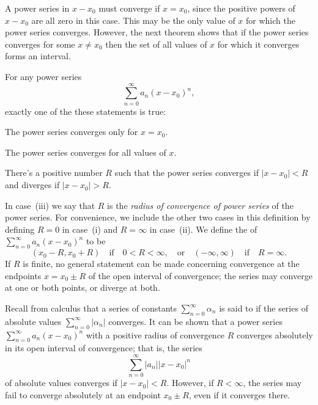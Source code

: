 A power series in $x-x_0$ must converge if $x=x_0$, since the positive
powers of $x-x_0$ are all zero in this case. This may be the only
value of $x$ for which the power series converges. However, the
next theorem shows that if the power series converges for some
$x\ne
x_0$ then the set of all values of $x$ for which it converges forms an
interval.

\begin{theorem}\label{thmtype:7.1.2}
For any power series
\[
\sum_{n=0}^\infty a_n(x-x_0)^n,
\]
exactly one of the these statements is true:
\begin{rmlist}
\item %
The power series converges  only for $x=x_0$.
\item %
The power series converges for all values of $x$.
\item %
There's a positive number $R$ such that  the power series
converges if $|x-x_0|<R$ and diverges if  $|x-x_0|>R$.
\end{rmlist}
\end{theorem}


In case~(iii) we say that $R$ is the
\emph{\color{blue}radius of convergence of power series}
of the power series. For convenience, we include the other two cases
in this definition by defining $R=0$ in case~(i) and $R=\infty$ in
case~(ii). We define the  of
$\sum_{n=0}^\infty a_n(x-x_0)^n$ to be
\[
 (x_0-R,x_0+R)\quad\text{if}\quad  0<R<\infty,
 \quad\text{or}\quad
 (-\infty,\infty) \quad\text{if}\quad R=\infty.
\]
If $R$ is finite, no general statement
can be made concerning convergence at the endpoints $x=x_0\pm R$ of
the open interval of convergence;   the series may converge at one or
both points, or diverge at both.


Recall from calculus that a series of constants
$\sum_{n=0}^\infty\alpha_n$ is said to  if
the series of absolute values $\sum_{n=0}^\infty|\alpha_n|$ converges.
It can be shown that a power series $\sum_{n=0}^\infty a_n(x-x_0)^n$
with a positive radius of convergence $R$ converges absolutely in its
open interval of convergence; that is, the series
\[
\sum_{n=0}^\infty |a_n||x-x_0|^n
\]
of absolute values  converges if $|x-x_0|<R$. However, if $R<\infty$,
the series may fail to converge absolutely at an endpoint $x_0\pm R$,
even if it converges there.

